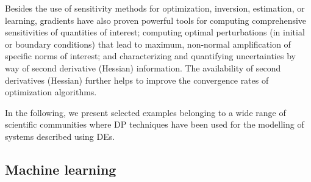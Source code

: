 Besides the use of sensitivity methods for optimization, inversion, estimation, or learning, gradients have also proven powerful tools for computing comprehensive sensitivities of quantities of interest; computing optimal perturbations (in initial or boundary conditions) that lead to maximum, non-normal amplification of specific norms of interest; and characterizing and quantifying uncertainties by way of second derivative (Hessian) information.
The availability of second derivatives (Hessian) further helps to improve the convergence rates of optimization algorithms.

In the following, we present selected examples belonging to a wide range of scientific communities where DP techniques have been used for the modelling of systems described using DEs. 

\subsection{Machine learning}

